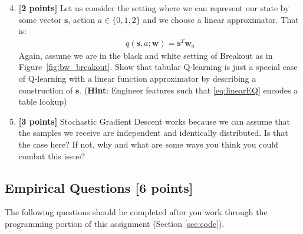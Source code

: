 \documentclass[11pt]{article}
\numberwithin{equation}{section} %
\numberwithin{figure}{section} %
\numberwithin{table}{section} %
\newcommand{\sv}{\mathbf{s}}
\newcommand{\wv}{\mathbf{w}}
\newcommand{\points}[1]{{\bf [#1 points]}}
\begin{document}
\begin{enumerate}
\setcounter{enumi}{3}
\item \textbf{[2 points]} Let us consider the setting where we can represent our state by some vector $\sv$, action $a \in \{0, 1, 2\}$ and we choose a linear approximator. That is:
\begin{align}
\label{eq:linearEQ}
q(\sv, a; \wv) = \sv^T\wv_a
\end{align}
Again, assume we are in the black and white setting of Breakout as in Figure~\ref{fig:bw_breakout}. Show that tabular Q-learning is just a special case of Q-learning with a linear function approximator by describing a construction of $\sv$. (\textbf{Hint}: Engineer features such that \ref{eq:linearEQ} encodes a table lookup)

\begin{tcolorbox}[fit,height=4cm, width=\linewidth, blank, borderline={1pt}{-2pt},nobeforeafter]
\end{tcolorbox}


\item \textbf{[3 points]} Stochastic Gradient Descent works because we can assume that the samples we receive are independent and identically distributed. Is that the case here? If not, why and what are some ways you think you could combat this issue?

\begin{tcolorbox}[fit,height=3cm, width=\linewidth, blank, borderline={1pt}{-2pt},nobeforeafter]
\end{tcolorbox}


\end{enumerate}




\clearpage
\subsection{Empirical Questions \points{6}}

The following questions should be completed after you work through the programming portion of this assignment (Section \ref{sec:code}). 
\end{document}
